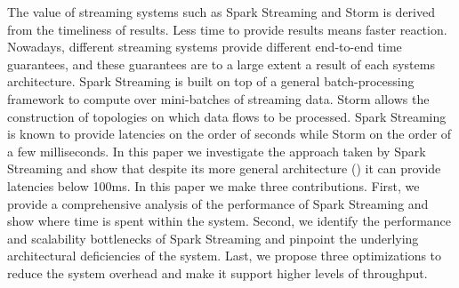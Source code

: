 \noindent The value of streaming systems such as Spark Streaming and Storm is derived from the timeliness of results. Less time to provide results means faster reaction. Nowadays, different streaming systems provide different end-to-end time guarantees, and these guarantees are to a large extent a result of each systems architecture. Spark Streaming is built on top of a general batch-processing framework to compute over mini-batches of streaming data. Storm allows the construction of topologies on which data flows to be processed. Spark Streaming is known to provide latencies on the order of seconds while Storm on the order of a few milliseconds. In this paper we investigate the approach taken by Spark Streaming and show that despite its more general architecture () it can provide latencies below 100ms. In this paper we make three contributions. First, we provide a comprehensive analysis of the performance of Spark Streaming and show where time is spent within the system. Second, we identify the performance and scalability bottlenecks of Spark Streaming and pinpoint the underlying architectural deficiencies of the system. Last, we propose three optimizations to reduce the system overhead and make it support higher levels of throughput.
        

